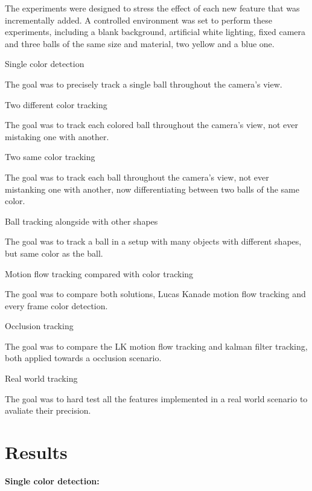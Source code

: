 \documentclass[10pt,twocolumn,letterpaper]{article}
\begin{document}
  The experiments were designed to stress the effect of each new feature that
  was incrementally added. A controlled environment was set to perform these
  experiments, including a blank background, artificial white lighting, fixed
  camera and three balls of the same size and material, two yellow and a blue
  one.

  Single color detection

  The goal was to precisely track a single ball throughout the camera's view.

  Two different color tracking

  The goal was to track each colored ball throughout the camera's view, not ever
  mistaking one with another.

  Two same color tracking

  The goal was to track each ball throughout the camera's view, not ever
  mistanking one with another, now differentiating between two balls of the same
  color.

  Ball tracking alongside with other shapes

  The goal was to track a ball in a setup with many objects with different
  shapes, but same color as the ball.

  Motion flow tracking compared with color tracking

  The goal was to compare both solutions, Lucas Kanade motion flow tracking and
  every frame color detection.

  Occlusion tracking

  The goal was to compare the LK motion flow tracking and kalman filter
  tracking, both applied towards a occlusion scenario.

  Real world tracking

  The goal was to hard test all the features implemented in a real world
  scenario to avaliate their precision.

\section{Results}

  \textbf{Single color detection:}
  \bigbreak
\end{document}
